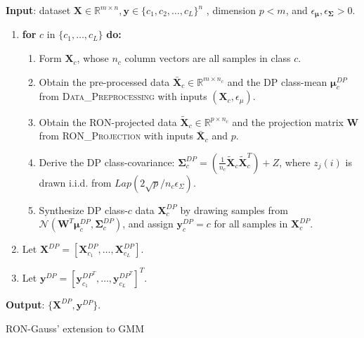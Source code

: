 \documentclass[USenglish,oneside,twocolumn]{article}
\newcommand{\noun}[1]{\textsc{#1}}
\theoremstyle{definition}
\theoremstyle{remark}
\theoremstyle{plain}
\theoremstyle{plain}
\begin{document}
\begin{algorithm}
{\small \par
\textbf{Input}{: dataset $\mathbf{X}\in\mathbb{R}^{m\times n},\mathbf{y}\in\{c_{1},c_{2},\ldots,c_{L}\}^{n}$
, dimension $p<m$, and $\epsilon_{\boldsymbol{\mu}},\epsilon_{\boldsymbol{\Sigma}}>0$.\vspace{0.5em}
}{\par}
\begin{enumerate}
\item \textbf{for} {$c$ in $\{c_{1},\ldots,c_{L}\}$ }\textbf{\small{}do:}{\small{}\vspace{0.5em}
}{\par}
\begin{enumerate}
\item {Form $\mathbf{X}_{c}$, whose $n_{c}$ column vectors are
all samples in class $c$.}{\par}
\item {Obtain the pre-processed data $\bar{\mathbf{X}}_{c}\in\mathbb{R}^{m\times n_{c}}$
and the DP class-mean $\boldsymbol{\mu}_{c}^{DP}$ from }\noun{Data\_Preprocessing}{
with inputs $(\mathbf{X}_{c},\epsilon_{\mu})$.}{ \par}
\item {Obtain the RON-projected data $\widetilde{\mathbf{X}}_{c}\in\mathbb{R}^{p\times n_{c}}$
and the projection matrix $\mathbf{W}$ from }\noun{\small{}RON\_Projection}{
with inputs $\bar{\mathbf{X}}_{c}$ and $p$.}{ \par}
\item {Derive the DP class-covariance: $\boldsymbol{\Sigma}_{c}^{DP}=(\frac{1}{n_{c}}\widetilde{\mathbf{X}}_{c}\widetilde{\mathbf{X}}_{c}^{T})+Z$,
where $z_{j}(i)$ is drawn i.i.d. from $Lap(2\sqrt{p}/n_{c}\epsilon_{\Sigma})$.}{\par}
\item {Synthesize DP class-$c$ data $\mathbf{X}_{c}^{DP}$ by drawing
samples from $\mathcal{N}(\mathbf{W}^{T}\boldsymbol{\mu}_{c}^{DP},\boldsymbol{\Sigma}_{c}^{DP})$,
and assign $\mathbf{y}_{c}^{DP}=c$ for all samples in $\mathbf{X}_{c}^{DP}$.

}{ \par}
\end{enumerate}
\item {Let $\mathbf{X}^{DP}=[\mathbf{X}_{c_{1}}^{DP},\ldots,\mathbf{X}_{c_{L}}^{DP}]$.}{ \par}

\item {Let $\mathbf{y}^{DP}=[\mathbf{y}_{c_{1}}^{DP^{T}},\ldots,\mathbf{y}_{c_{L}}^{DP^{T}}]^{T}$.\vspace{-0.5em}
}{ \par}
\end{enumerate}
\textbf{Output}{: $\{\mathbf{X}^{DP},\mathbf{y}^{DP}\}$.
}
}
\caption{RON-Gauss' extension to GMM\label{alg:RON-Gauss-for-gmm}}
\end{algorithm}
\end{document}
